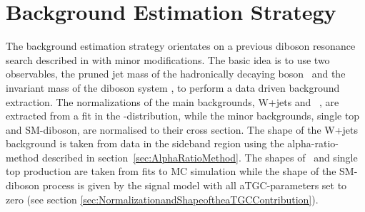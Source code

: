 \section{Background Estimation Strategy}
The background estimation strategy orientates on a previous diboson resonance search described in \cite{resonancepas} with minor modifications. The basic idea is to use two observables, the pruned jet mass of the hadronically decaying boson \Mpr \ and the invariant mass of the diboson system \MWV, to perform a data driven background extraction. The normalizations of the main backgrounds, W+jets and \ttbar \ , are extracted from a fit in the \Mpr -distribution, while the minor backgrounds, single top and SM-diboson, are normalised to their cross section. The shape of the W+jets background is taken from data in the sideband region using the alpha-ratio-method described in section~\ref{sec:AlphaRatioMethod}. The shapes of \ttbar \ and single top production are taken from fits to MC simulation while the shape of the SM-diboson process is given by the signal model with all aTGC-parameters set to zero (see section \ref{sec:NormalizationandShapeoftheaTGCContribution}).

